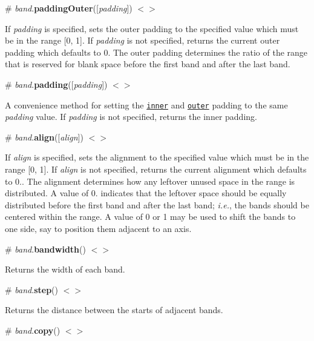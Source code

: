 \label{_band_paddingOuter}%
\# {\itshape band}.{\bfseries padding\+Outer}(\mbox{[}{\itshape padding}\mbox{]}) \href{https://github.com/d3/d3-scale/blob/master/src/band.js#L64}{\tt $<$$>$}

If {\itshape padding} is specified, sets the outer padding to the specified value which must be in the range \mbox{[}0, 1\mbox{]}. If {\itshape padding} is not specified, returns the current outer padding which defaults to 0. The outer padding determines the ratio of the range that is reserved for blank space before the first band and after the last band.

\label{_band_padding}%
\# {\itshape band}.{\bfseries padding}(\mbox{[}{\itshape padding}\mbox{]}) \href{https://github.com/d3/d3-scale/blob/master/src/band.js#L56}{\tt $<$$>$}

A convenience method for setting the \href{#band_paddingInner}{\tt inner} and \href{#band_paddingOuter}{\tt outer} padding to the same {\itshape padding} value. If {\itshape padding} is not specified, returns the inner padding.

\label{_band_align}%
\# {\itshape band}.{\bfseries align}(\mbox{[}{\itshape align}\mbox{]}) \href{https://github.com/d3/d3-scale/blob/master/src/band.js#L68}{\tt $<$$>$}

If {\itshape align} is specified, sets the alignment to the specified value which must be in the range \mbox{[}0, 1\mbox{]}. If {\itshape align} is not specified, returns the current alignment which defaults to 0.. The alignment determines how any leftover unused space in the range is distributed. A value of 0. indicates that the leftover space should be equally distributed before the first band and after the last band; {\itshape i.\+e.}, the bands should be centered within the range. A value of 0 or 1 may be used to shift the bands to one side, say to position them adjacent to an axis.

\label{_band_bandwidth}%
\# {\itshape band}.{\bfseries bandwidth}() \href{https://github.com/d3/d3-scale/blob/master/src/band.js#L44}{\tt $<$$>$}

Returns the width of each band.

\label{_band_step}%
\# {\itshape band}.{\bfseries step}() \href{https://github.com/d3/d3-scale/blob/master/src/band.js#L48}{\tt $<$$>$}

Returns the distance between the starts of adjacent bands.

\label{_band_copy}%
\# {\itshape band}.{\bfseries copy}() \href{https://github.com/d3/d3-scale/blob/master/src/band.js#L72}{\tt $<$$>$}

